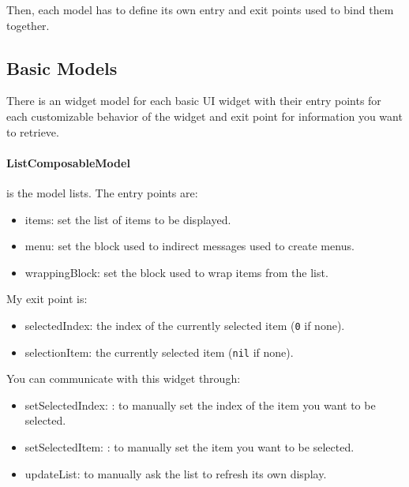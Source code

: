 \documentclass[a4paper,10pt,twoside]{book}
\begin{document}
Then, each model has to define its own entry and exit points used to bind them together.

\subsection{Basic Models}

There is an widget model for each basic UI widget  with their entry points for each customizable behavior of the widget and exit point for information you want to retrieve.  

\paragraph{ListComposableModel} is the model lists.
The entry points are:
\begin{itemize}
	\item items: set the list of items to be displayed.
	\item menu: set the block used to indirect messages used to create menus.
	\item wrappingBlock: set the block used to wrap items from the list.
\end{itemize}
My exit point is:
\begin{itemize}
	\item selectedIndex: the index of the currently selected item (\verb+0+ if none).
	\item selectionItem: the currently selected item (\verb+nil+ if none).
\end{itemize}
You can communicate with this widget through:
\begin{itemize}
\item setSelectedIndex: : to manually set the index of the item you want to be selected.
\item setSelectedItem: : to manually set the item you want to be selected. 
\item updateList: to manually ask the list to refresh its own display.
\end{itemize}
\end{document}
